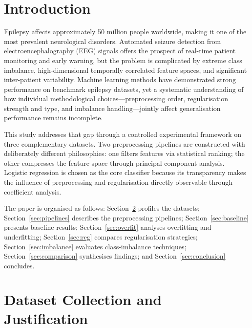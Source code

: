 \documentclass[conference]{IEEEtran}
\begin{document}
\section{Introduction}

Epilepsy affects approximately 50 million people worldwide, making it
one of the most prevalent neurological disorders. Automated seizure
detection from electroencephalography (EEG) signals offers the prospect
of real-time patient monitoring and early warning, but the problem is
complicated by extreme class imbalance, high-dimensional temporally
correlated feature spaces, and significant inter-patient variability.
Machine learning methods have demonstrated strong performance on
benchmark epilepsy datasets, yet a systematic understanding of how
individual methodological choices---preprocessing order, regularisation
strength and type, and imbalance handling---jointly affect generalisation
performance remains incomplete.

This study addresses that gap through a controlled experimental framework
on three complementary datasets. Two preprocessing pipelines are
constructed with deliberately different philosophies: one filters features
via statistical ranking; the other compresses the feature space through
principal component analysis. Logistic regression is chosen as the core
classifier because its transparency makes the influence of preprocessing
and regularisation directly observable through coefficient analysis.

The paper is organised as follows: Section~\ref{sec:data} profiles the
datasets; Section~\ref{sec:pipelines} describes the preprocessing
pipelines; Section~\ref{sec:baseline} presents baseline results;
Section~\ref{sec:overfit} analyses overfitting and underfitting;
Section~\ref{sec:reg} compares regularisation strategies;
Section~\ref{sec:imbalance} evaluates class-imbalance techniques;
Section~\ref{sec:comparison} synthesises findings; and
Section~\ref{sec:conclusion} concludes.

\section{Dataset Collection and Justification}
\label{sec:data}
\end{document}
